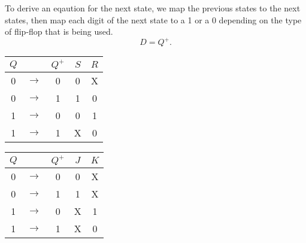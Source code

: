 \documentclass{report}
\begin{document}
\newpage

To derive an eqaution for the next state, we map the previous states to the next states, then map each digit of the next state to a 1 or a 0 depending on the type of flip-flop that is being used.
\[
	D = Q^+
	.\]

\begin{center}
	\begin{minipage}[t]{0.3\textwidth}
		\begin{table}[H]
			\centering
			\begin{tabular}{ccc|cc}
				$Q$ &       & $Q^+$ & $S$ & $R$ \\
				\hline
				0   & $\to$ & 0     & 0   & X   \\
				0   & $\to$ & 1     & 1   & 0   \\
				1   & $\to$ & 0     & 0   & 1   \\
				1   & $\to$ & 1     & X   & 0   \\
			\end{tabular}
		\end{table}
	\end{minipage}
	\begin{minipage}[t]{0.3\textwidth}
		\begin{table}[H]
			\centering
			\begin{tabular}{ccc|cc}
				$Q$ &       & $Q^+$ & $J$ & $K$ \\
				\hline
				0   & $\to$ & 0     & 0   & X   \\
				0   & $\to$ & 1     & 1   & X   \\
				1   & $\to$ & 0     & X   & 1   \\
				1   & $\to$ & 1     & X   & 0   \\
			\end{tabular}
		\end{table}
	\end{minipage}
\end{center}
\end{document}
